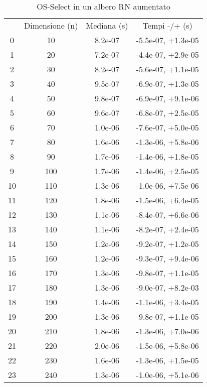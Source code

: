 \begin{table}
\centering
\caption{OS-Select in un albero RN aumentato}
\label{OS-Select in un albero RN aumentato}
\begin{adjustbox}{width=1\textwidth/2}
\begin{tabular}{|c|c|c|c|}
\hline
 & Dimensione (n) & Mediana (s) & Tempi -/+ (s) \\
0 & 10 & 8.2e-07 & -5.5e-07, +1.3e-05 \\
\cline{1-4}
1 & 20 & 7.2e-07 & -4.4e-07, +2.9e-05 \\
\cline{1-4}
2 & 30 & 8.2e-07 & -5.6e-07, +1.1e-05 \\
\cline{1-4}
3 & 40 & 9.5e-07 & -6.9e-07, +1.3e-05 \\
\cline{1-4}
4 & 50 & 9.8e-07 & -6.9e-07, +9.1e-06 \\
\cline{1-4}
5 & 60 & 9.6e-07 & -6.8e-07, +2.5e-05 \\
\cline{1-4}
6 & 70 & 1.0e-06 & -7.6e-07, +5.0e-05 \\
\cline{1-4}
7 & 80 & 1.6e-06 & -1.3e-06, +5.8e-06 \\
\cline{1-4}
8 & 90 & 1.7e-06 & -1.4e-06, +1.8e-05 \\
\cline{1-4}
9 & 100 & 1.7e-06 & -1.4e-06, +2.5e-05 \\
\cline{1-4}
10 & 110 & 1.3e-06 & -1.0e-06, +7.5e-06 \\
\cline{1-4}
11 & 120 & 1.8e-06 & -1.5e-06, +6.4e-05 \\
\cline{1-4}
12 & 130 & 1.1e-06 & -8.4e-07, +6.6e-06 \\
\cline{1-4}
13 & 140 & 1.1e-06 & -8.2e-07, +2.4e-05 \\
\cline{1-4}
14 & 150 & 1.2e-06 & -9.2e-07, +1.2e-05 \\
\cline{1-4}
15 & 160 & 1.2e-06 & -9.3e-07, +9.4e-06 \\
\cline{1-4}
16 & 170 & 1.3e-06 & -9.8e-07, +1.1e-05 \\
\cline{1-4}
17 & 180 & 1.3e-06 & -9.0e-07, +8.2e-03 \\
\cline{1-4}
18 & 190 & 1.4e-06 & -1.1e-06, +3.4e-05 \\
\cline{1-4}
19 & 200 & 1.3e-06 & -9.8e-07, +1.1e-05 \\
\cline{1-4}
20 & 210 & 1.8e-06 & -1.3e-06, +7.0e-06 \\
\cline{1-4}
21 & 220 & 2.0e-06 & -1.5e-06, +5.8e-06 \\
\cline{1-4}
22 & 230 & 1.6e-06 & -1.3e-06, +1.5e-05 \\
\cline{1-4}
23 & 240 & 1.3e-06 & -1.0e-06, +5.1e-06 \\

\end{tabular}
\end{adjustbox}
\end{table}
